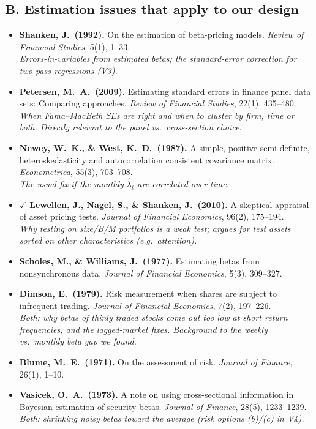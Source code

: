 \documentclass[11pt]{article}
\begin{document}
\subsection*{B. Estimation issues that apply to our design}
\begin{itemize}
  \item \textbf{Shanken, J.\ (1992).} On the estimation of beta-pricing models. \emph{Review of Financial Studies}, 5(1), 1--33.\\
  \textit{Errors-in-variables from estimated betas; the standard-error correction for two-pass regressions (V3).}
  \item \textbf{Petersen, M.\ A.\ (2009).} Estimating standard errors in finance panel data sets: Comparing approaches. \emph{Review of Financial Studies}, 22(1), 435--480.\\
  \textit{When Fama--MacBeth SEs are right and when to cluster by firm, time or both. Directly relevant to the panel vs.\ cross-section choice.}
  \item \textbf{Newey, W.\ K., \& West, K.\ D.\ (1987).} A simple, positive semi-definite, heteroskedasticity and autocorrelation consistent covariance matrix. \emph{Econometrica}, 55(3), 703--708.\\
  \textit{The usual fix if the monthly $\hat\lambda_t$ are correlated over time.}
  \item $\checkmark$ \textbf{Lewellen, J., Nagel, S., \& Shanken, J.\ (2010).} A skeptical appraisal of asset pricing tests. \emph{Journal of Financial Economics}, 96(2), 175--194.\\
  \textit{Why testing on size/B/M portfolios is a weak test; argues for test assets sorted on other characteristics (e.g.\ attention).}
  \item \textbf{Scholes, M., \& Williams, J.\ (1977).} Estimating betas from nonsynchronous data. \emph{Journal of Financial Economics}, 5(3), 309--327.
  \item \textbf{Dimson, E.\ (1979).} Risk measurement when shares are subject to infrequent trading. \emph{Journal of Financial Economics}, 7(2), 197--226.\\
  \textit{Both: why betas of thinly traded stocks come out too low at short return frequencies, and the lagged-market fixes. Background to the weekly vs.\ monthly beta gap we found.}
  \item \textbf{Blume, M.\ E.\ (1971).} On the assessment of risk. \emph{Journal of Finance}, 26(1), 1--10.
  \item \textbf{Vasicek, O.\ A.\ (1973).} A note on using cross-sectional information in Bayesian estimation of security betas. \emph{Journal of Finance}, 28(5), 1233--1239.\\
  \textit{Both: shrinking noisy betas toward the average (risk options (b)/(c) in V4).}
\end{itemize}
\end{document}

